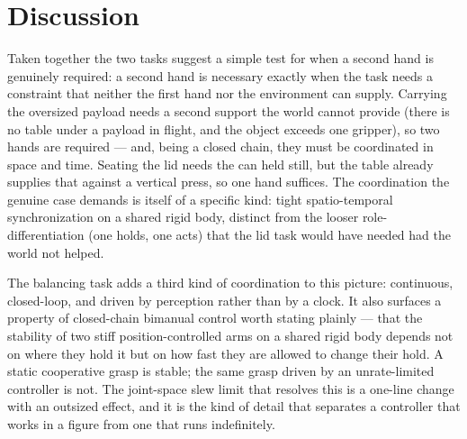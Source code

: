 \documentclass[runningheads]{llncs}
\begin{document}
\section{Discussion}
Taken together the two tasks suggest a simple test for when a second hand is genuinely required: a second hand is necessary exactly when the task needs a constraint that neither the first hand nor the environment can supply. Carrying the oversized payload needs a second support the world cannot provide (there is no table under a payload in flight, and the object exceeds one gripper), so two hands are required --- and, being a closed chain, they must be coordinated in space and time. Seating the lid needs the can held still, but the table already supplies that against a vertical press, so one hand suffices. The coordination the genuine case demands is itself of a specific kind: tight spatio-temporal synchronization on a shared rigid body, distinct from the looser role-differentiation (one holds, one acts) that the lid task would have needed had the world not helped.

The balancing task adds a third kind of coordination to this picture: continuous, closed-loop, and driven by perception rather than by a clock. It also surfaces a property of closed-chain bimanual control worth stating plainly --- that the stability of two stiff position-controlled arms on a shared rigid body depends not on where they hold it but on how fast they are allowed to change their hold. A static cooperative grasp is stable; the same grasp driven by an unrate-limited controller is not. The joint-space slew limit that resolves this is a one-line change with an outsized effect, and it is the kind of detail that separates a controller that works in a figure from one that runs indefinitely.
\end{document}
